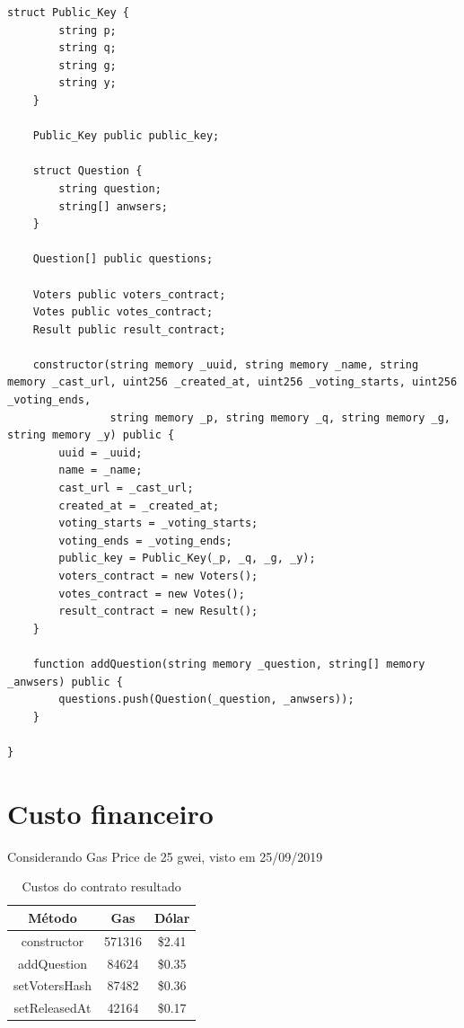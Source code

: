 \documentclass{ufsctex/ufsctex}
\begin{document}
\begin{lstlisting}[language=Solidity]
    struct Public_Key {
        string p;
        string q;
        string g;
        string y;
    }
    
    Public_Key public public_key;
    
    struct Question {
        string question;
        string[] anwsers;
    }
    
    Question[] public questions;
    
    Voters public voters_contract;
    Votes public votes_contract;
    Result public result_contract;
    
    constructor(string memory _uuid, string memory _name, string memory _cast_url, uint256 _created_at, uint256 _voting_starts, uint256 _voting_ends,
                string memory _p, string memory _q, string memory _g, string memory _y) public {
        uuid = _uuid;
        name = _name;
        cast_url = _cast_url;
        created_at = _created_at;
        voting_starts = _voting_starts;
        voting_ends = _voting_ends;
        public_key = Public_Key(_p, _q, _g, _y);
        voters_contract = new Voters();
        votes_contract = new Votes();
        result_contract = new Result();
    }
    
    function addQuestion(string memory _question, string[] memory _anwsers) public {
        questions.push(Question(_question, _anwsers));
    }
    
}

\end{lstlisting}

\section{Custo financeiro}

Considerando Gas Price de 25 gwei, visto em 25/09/2019

\begin{table}[]
\centering
\begin{tabular}{|c|c|c|}
\hline
Método        & Gas    & Dólar  \\ \hline
constructor   & 571316 & \$2.41 \\ \hline
addQuestion   & 84624  & \$0.35 \\ \hline
setVotersHash & 87482  & \$0.36 \\ \hline
setReleasedAt & 42164  & \$0.17 \\ \hline
\end{tabular}
\caption{Custos do contrato resultado}
\label{tab:my-table}
\end{table}
\end{document}
